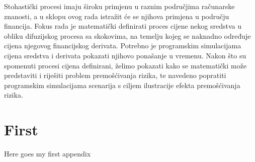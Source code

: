 \documentclass[times, utf8, diplomski]{fer}
\begin{document}
\begin{sazetak}
Stohastički procesi imaju široku primjenu u raznim područjima računarske znanosti, a u sklopu ovog rada istražit će se njihova primjena u području financija. Fokus rada je matematički definirati proces cijene nekog sredstva u obliku difuzijskog procesa sa skokovima, na temelju kojeg se naknadno određuje cijena njegovog financijskog derivata. Potrebno je programskim simulacijama cijena sredstva i derivata pokazati njihovo ponašanje u vremenu. Nakon što su spomenuti procesi cijena definirani, želimo pokazati kako se matematički može predstaviti i riješiti problem premošćivanja rizika, te navedeno popratiti programskim simulacijama scenarija s ciljem ilustracije efekta premošćivanja rizika.

\end{sazetak}

\appendix

\chapter{First}
Here goes my first appendix
\end{document}
